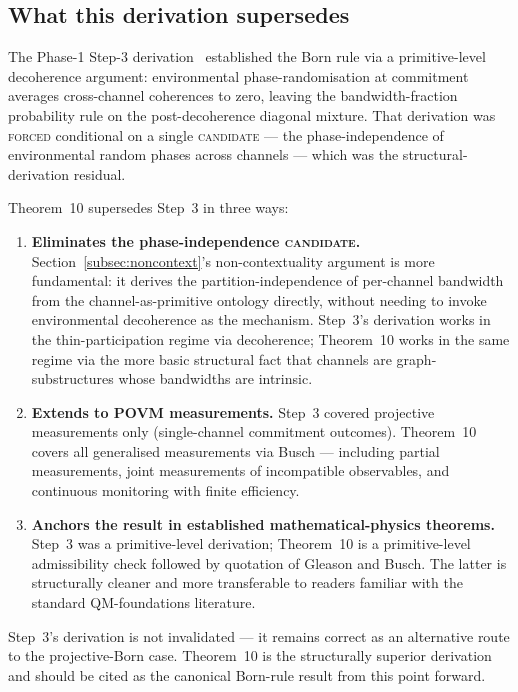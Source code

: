 \documentclass[11pt,a4paper]{article}
\begin{document}
\subsection{What this derivation supersedes}

The Phase-1 Step-3 derivation~\cite[\S 3.3]{phase1} established the Born rule via a primitive-level decoherence argument: environmental phase-randomisation at commitment averages cross-channel coherences to zero, leaving the bandwidth-fraction probability rule on the post-decoherence diagonal mixture. That derivation was \textsc{forced} conditional on a single \textsc{candidate} --- the phase-independence of environmental random phases across channels --- which was the structural-derivation residual.

Theorem~10 supersedes Step~3 in three ways:

\begin{enumerate}
  \item \textbf{Eliminates the phase-independence \textsc{candidate}.} Section~\ref{subsec:noncontext}'s non-contextuality argument is more fundamental: it derives the partition-independence of per-channel bandwidth from the channel-as-primitive ontology directly, without needing to invoke environmental decoherence as the mechanism. Step~3's derivation works in the thin-participation regime via decoherence; Theorem~10 works in the same regime via the more basic structural fact that channels are graph-substructures whose bandwidths are intrinsic.
  \item \textbf{Extends to POVM measurements.} Step~3 covered projective measurements only (single-channel commitment outcomes). Theorem~10 covers all generalised measurements via Busch --- including partial measurements, joint measurements of incompatible observables, and continuous monitoring with finite efficiency.
  \item \textbf{Anchors the result in established mathematical-physics theorems.} Step~3 was a primitive-level derivation; Theorem~10 is a primitive-level admissibility check followed by quotation of Gleason and Busch. The latter is structurally cleaner and more transferable to readers familiar with the standard QM-foundations literature.
\end{enumerate}

Step~3's derivation is not invalidated --- it remains correct as an alternative route to the projective-Born case. Theorem~10 is the structurally superior derivation and should be cited as the canonical Born-rule result from this point forward.
\end{document}
